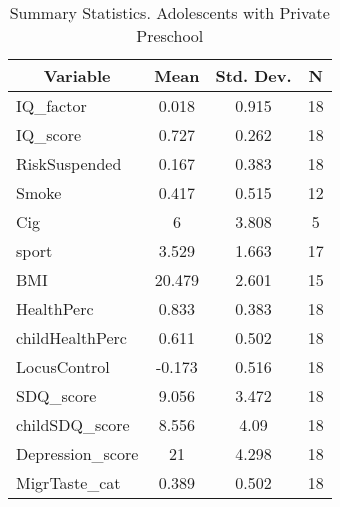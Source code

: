 
\begin{table}[htbp]\centering \caption{Summary Statistics. Adolescents with Private Preschool \label{schoolAdolmaternaPriv}}
\begin{tabular}{l c c  c}\hline\hline
\multicolumn{1}{c}{\textbf{Variable}} & \textbf{Mean}
 & \textbf{Std. Dev.} & \textbf{N}\\ \hline
IQ\_factor & 0.018 & 0.915  & 18\\
IQ\_score & 0.727 & 0.262  & 18\\
RiskSuspended & 0.167 & 0.383  & 18\\
Smoke & 0.417 & 0.515  & 12\\
Cig & 6 & 3.808  & 5\\
sport & 3.529 & 1.663  & 17\\
BMI & 20.479 & 2.601  & 15\\
HealthPerc & 0.833 & 0.383  & 18\\
childHealthPerc & 0.611 & 0.502  & 18\\
LocusControl & -0.173 & 0.516  & 18\\
SDQ\_score & 9.056 & 3.472  & 18\\
childSDQ\_score & 8.556 & 4.09  & 18\\
Depression\_score & 21 & 4.298  & 18\\
MigrTaste\_cat & 0.389 & 0.502  & 18\\
\hline\end{tabular}
\end{table}
